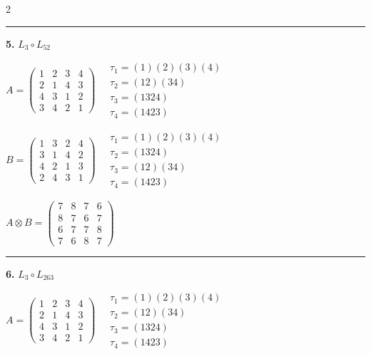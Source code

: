 \begin{multicols}{2}
\vspace{0.3em}
\hrule
\vspace{0.3em}

\noindent\textbf{5.} $L_{3} \circ L_{52}$

$A = \begin{pmatrix} 1 & 2 & 3 & 4 \\ 2 & 1 & 4 & 3 \\ 4 & 3 & 1 & 2 \\ 3 & 4 & 2 & 1 \end{pmatrix} \quad \begin{matrix} \tau_{1}=(1)(2)(3)(4) \\ \tau_{2}=(1 2)(3 4) \\ \tau_{3}=(1 3 2 4) \\ \tau_{4}=(1 4 2 3) \end{matrix}$

$B = \begin{pmatrix} 1 & 3 & 2 & 4 \\ 3 & 1 & 4 & 2 \\ 4 & 2 & 1 & 3 \\ 2 & 4 & 3 & 1 \end{pmatrix} \quad \begin{matrix} \tau_{1}=(1)(2)(3)(4) \\ \tau_{2}=(1 3 2 4) \\ \tau_{3}=(1 2)(3 4) \\ \tau_{4}=(1 4 2 3) \end{matrix}$

$A \otimes B = \begin{pmatrix} 7 & 8 & 7 & 6 \\ 8 & 7 & 6 & 7 \\ 6 & 7 & 7 & 8 \\ 7 & 6 & 8 & 7 \end{pmatrix}$

\vspace{0.3em}
\hrule
\vspace{0.3em}

\noindent\textbf{6.} $L_{3} \circ L_{263}$

$A = \begin{pmatrix} 1 & 2 & 3 & 4 \\ 2 & 1 & 4 & 3 \\ 4 & 3 & 1 & 2 \\ 3 & 4 & 2 & 1 \end{pmatrix} \quad \begin{matrix} \tau_{1}=(1)(2)(3)(4) \\ \tau_{2}=(1 2)(3 4) \\ \tau_{3}=(1 3 2 4) \\ \tau_{4}=(1 4 2 3) \end{matrix}$


\end{multicols}
